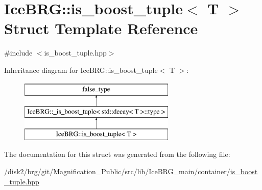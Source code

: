 \hypertarget{structIceBRG_1_1is__boost__tuple}{}\section{Ice\+B\+R\+G\+:\+:is\+\_\+boost\+\_\+tuple$<$ T $>$ Struct Template Reference}
\label{structIceBRG_1_1is__boost__tuple}


{\ttfamily \#include $<$is\+\_\+boost\+\_\+tuple.\+hpp$>$}

Inheritance diagram for Ice\+B\+R\+G\+:\+:is\+\_\+boost\+\_\+tuple$<$ T $>$\+:\begin{figure}[H]
\begin{center}
\leavevmode
\includegraphics[height=3.000000cm]{structIceBRG_1_1is__boost__tuple}
\end{center}
\end{figure}


The documentation for this struct was generated from the following file\+:\begin{DoxyCompactItemize}
\item 
/disk2/brg/git/\+Magnification\+\_\+\+Public/src/lib/\+Ice\+B\+R\+G\+\_\+main/container/\hyperlink{is__boost__tuple_8hpp}{is\+\_\+boost\+\_\+tuple.\+hpp}\end{DoxyCompactItemize}

